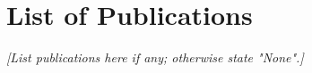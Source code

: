 \documentclass[12pt]{report}
\begin{document}
\clearpage
\chapter*{List of Publications}
\textit{[List publications here if any; otherwise state "None".]}
\end{document}
